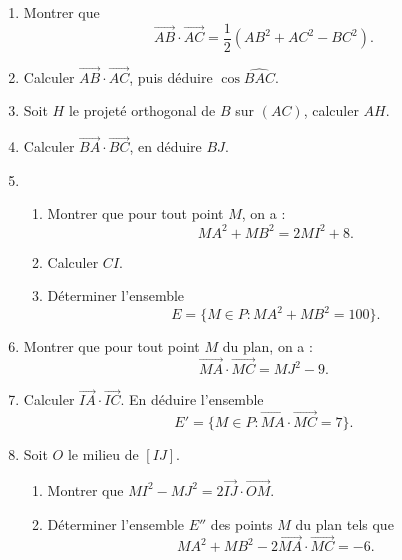 \documentclass[12pt]{article}
\begin{document}
\begin{enumerate}
    \item Montrer que 
    \[
    \overrightarrow{AB} \cdot \overrightarrow{AC} = \frac{1}{2}(AB^2 + AC^2 - BC^2).
    \]

    \item Calculer $\overrightarrow{AB} \cdot \overrightarrow{AC}$, puis déduire $\cos\widehat{BAC}$.

    \item Soit $H$ le projeté orthogonal de $B$ sur $(AC)$, calculer $AH$.

    \item Calculer $\overrightarrow{BA} \cdot \overrightarrow{BC}$, en déduire $BJ$.

    \item 
    \begin{enumerate}
        \item Montrer que pour tout point $M$, on a :
        \[
        MA^2 + MB^2 = 2MI^2 + 8.
        \]

        \item Calculer $CI$.

        \item Déterminer l’ensemble 
        \[
        E = \{M \in P : MA^2 + MB^2 = 100\}.
        \]
    \end{enumerate}

    \item Montrer que pour tout point $M$ du plan, on a :
    \[
    \overrightarrow{MA} \cdot \overrightarrow{MC} = MJ^2 - 9.
    \]

    \item Calculer $\overrightarrow{IA} \cdot \overrightarrow{IC}$. En déduire l’ensemble 
    \[
    E' = \{M \in P : \overrightarrow{MA} \cdot \overrightarrow{MC} = 7\}.
    \]

    \item Soit $O$ le milieu de $[IJ]$.
    \begin{enumerate}
        \item Montrer que $MI^2 - MJ^2 = 2\overrightarrow{IJ} \cdot \overrightarrow{OM}$.
        \item Déterminer l’ensemble $E''$ des points $M$ du plan tels que 
        \[
        MA^2 + MB^2 - 2\overrightarrow{MA} \cdot \overrightarrow{MC} = -6.
        \]
    \end{enumerate}
\end{enumerate}
\end{document}
